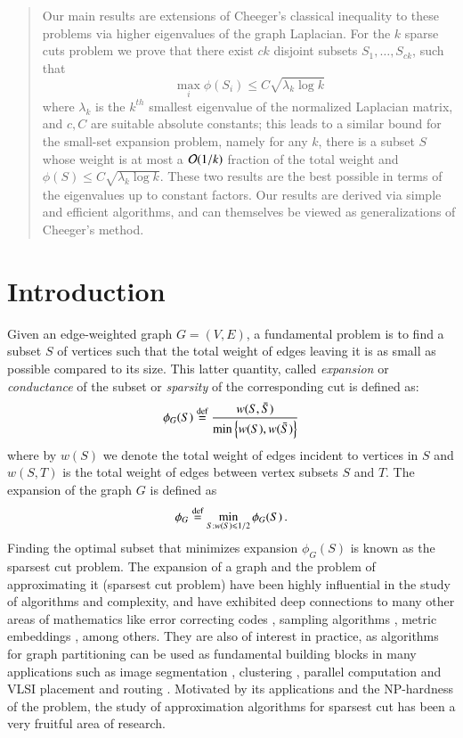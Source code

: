 \documentclass[11pt]{article}
\begin{document}
\begin{titlepage}
\begin{abstract}
Our main results are extensions of Cheeger's classical inequality to these problems via higher eigenvalues of the graph Laplacian.
For the $k$ sparse cuts problem we prove that there exist
$ck$ disjoint subsets $S_1, \ldots, S_{ck}$, such that
\[  \max_i  \phi(S_i) \leq C \sqrt{\lambda_{k} \log k} \]
where $\lambda_k$ is the $k^{th}$ smallest eigenvalue of the normalized Laplacian matrix, and 
$c,C$ are suitable absolute constants; this leads to a similar bound 
for the small-set expansion problem, namely for any $k$, there is a subset $S$ whose
weight is at most a $\mathcal{O}(1/k)$ fraction of the total weight and 
$\phi(S) \le C \sqrt{\lambda_k \log k}$. These two results are the best possible in terms of the eigenvalues up to constant factors. 
Our results are derived via simple and efficient algorithms, and can themselves be viewed as generalizations of Cheeger's method.
\end{abstract}

\end{titlepage}

\section{Introduction}

Given an edge-weighted graph $G=(V,E)$, a fundamental problem is to find a subset $S$ 
of vertices such that the total weight of edges leaving it is as small as possible 
compared to its size. 
%
This latter quantity, called {\em expansion} or {\em conductance} 
of the subset or {\em sparsity} of the corresponding cut is defined as:
\[ \phi_G(S) \stackrel{\textup{def}}{=} \frac{w(S,\bar{S})}{\min \left\{w(S), w(\bar{S})\right\}} \]
where by $w(S)$ we denote the total weight of edges incident to vertices in $S$ and $w(S,T)$ is the total weight of edges between vertex subsets $S$ and $T$.
%
The expansion of the graph $G$ is defined as
\[ \phi_G \stackrel{\textup{def}}{=} \min_{S: w(S) \leqslant 1/2} \phi_G(S) \,. \]
%
Finding the optimal subset that minimizes expansion $\phi_{G}(S)$ is
known as the sparsest cut problem.
%
The expansion  of a graph and the problem of approximating it (sparsest cut problem) have been
highly influential in the study of algorithms and complexity, and have exhibited deep connections to many other areas of mathematics
like error correcting codes \cite{ss96}, sampling algorithms \cite{js87}, metric embeddings \cite{llr95}, 
 among others. 
% 
They are also of interest in practice, as algorithms for graph partitioning can 
be used as fundamental building blocks in many applications such as image segmentation \cite{sm00},
clustering \cite{d01} , parallel computation \cite{ggkk94} and VLSI placement and routing \cite{aj95}. 
%
Motivated by its applications and the NP-hardness of the problem, 
the study of approximation algorithms for sparsest cut has been a very fruitful area of research.
%
\end{document}
